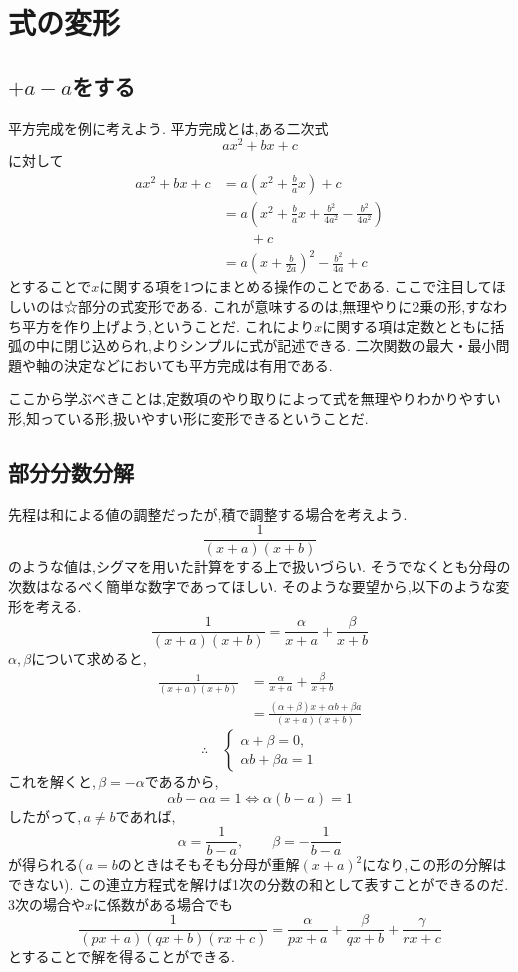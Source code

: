 
\section{式の変形}
  \subsection{$+a-a$をする}
    平方完成を例に考えよう.
    平方完成とは,ある二次式
    \[
      ax^2+bx+c
    \]
    に対して
    \begin{align*}
      ax^2+bx+c&=a\left(x^2+\frac{b}{a}x\right) +c\\
      &=a\left(x^2+\frac{b}{a}x+\frac{b^2}{4a^2}-\frac{b^2}{4a^2}\right)\\
      &\qquad +c \tag*{\(\cdots\) (☆)}\\
      &=a\left(x+\frac{b}{2a}\right)^2-\frac{b^2}{4a}+c
    \end{align*}
    とすることで$x$に関する項を1つにまとめる操作のことである.
    ここで注目してほしいのは☆部分の式変形である.
    これが意味するのは,無理やりに2乗の形,すなわち平方を作り上げよう,ということだ.
    これにより$x$に関する項は定数とともに括弧の中に閉じ込められ,よりシンプルに式が記述できる.
    二次関数の最大・最小問題や軸の決定などにおいても平方完成は有用である.

    ここから学ぶべきことは,定数項のやり取りによって式を無理やりわかりやすい形,知っている形,扱いやすい形に変形できるということだ.

  \subsection{部分分数分解}
    先程は和による値の調整だったが,積で調整する場合を考えよう.
    \[
      \frac{1}{(x+a)(x+b)}
    \]
    のような値は,シグマを用いた計算をする上で扱いづらい.
    そうでなくとも分母の次数はなるべく簡単な数字であってほしい.
    そのような要望から,以下のような変形を考える.
    \[
      \frac{1}{(x+a)(x+b)}=\frac{\alpha}{x+a}+\frac{\beta}{x+b}
    \]
    $\alpha,\beta$について求めると,
    \begin{align*}
    \frac{1}{(x+a)(x+b)}
      &= \frac{\alpha}{x+a}+\frac{\beta}{x+b}\\
      &= \frac{(\alpha+\beta)x+\alpha b+\beta a}
      {(x+a)(x+b)}
    \end{align*}
    \[
    \therefore\quad
    \begin{cases}
    \alpha+\beta=0,\\
    \alpha b+\beta a=1
    \end{cases}
    \]
    これを解くと,\,$\beta=-\alpha$であるから,
    \[
      \alpha b-\alpha a=1
      \iff \alpha(b-a)=1
    \]
    したがって,\,$a\ne b$であれば,
    \[
      \alpha=\frac{1}{b-a},
      \qquad
      \beta=-\frac{1}{b-a}
    \]
    が得られる(\,$a=b$のときはそもそも分母が重解$(x+a)^2$になり,この形の分解はできない).
    この連立方程式を解けば1次の分数の和として表すことができるのだ.
    3次の場合や$x$に係数がある場合でも
    \[
      \frac{1}{(px+a)(qx+b)(rx+c)}=\frac{\alpha}{px+a}+\frac{\beta}{qx+b}+\frac{\gamma}{rx+c}
    \]
    とすることで解を得ることができる.

